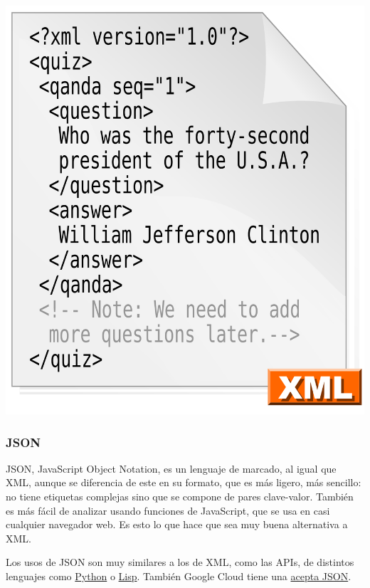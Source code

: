 \documentclass{article}
\begin{document}
\begin{center}
\includegraphics[scale=0.07]{images/XML.png}
\end{center}

\subsubsection{JSON}

JSON, JavaScript Object Notation, es un lenguaje de marcado, al igual que XML, aunque se diferencia de este en su formato, que es más ligero, más sencillo: no tiene etiquetas complejas sino que se compone de pares clave-valor. También es más fácil de analizar usando funciones de JavaScript, que se usa en casi cualquier navegador web. Es esto lo que hace que sea muy buena alternativa a XML.

Los usos de JSON son muy similares a los de XML, como las APIs, de distintos lenguajes como \href{https://docs.python.org/2/library/json.html}{Python} o \href{https://common-lisp.net/project/cl-json/cl-json.html}{Lisp}. También Google Cloud tiene una \href{https://cloud.google.com/bigquery/docs/loading-data-cloud-storage-json}{acepta JSON}.
\end{document}

